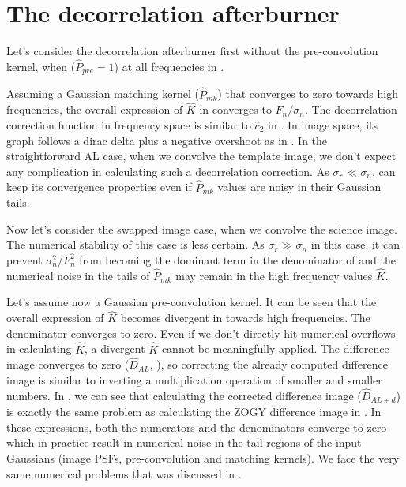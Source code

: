 \section{The decorrelation afterburner\label{sec:decorrab}}
Let's consider the decorrelation afterburner first without the
pre-convolution kernel, when (\(\hat{P}_{pre}=1\)) at all frequencies
in .
%
\par Assuming a Gaussian matching kernel (\(\hat{P}_{mk}\)) that
converges to zero towards high frequencies, the overall expression of
\(\hat{K}\) in  converges to \(F_{n}/\sigma_n\). The
decorrelation correction function in frequency space is similar to
\(\hat{c}_2\) in . In image space, its
graph follows a dirac delta plus a negative overshoot as in
. In the straightforward AL case, when
we convolve the template image, we don't expect any complication in
calculating such a decorrelation correction. As \(\sigma_r \ll
\sigma_n\),  can keep its convergence properties even if
\(\hat{P}_{mk}\) values are noisy in their Gaussian tails.
%
\par Now let's consider the swapped image case, when we convolve the
science image.  The numerical stability of this case is less
certain. As \(\sigma_r \gg \sigma_n\) in this case, it can prevent
\(\sigma_{n}^2/F_n^2\) from becoming the dominant term in the
denominator of  and the numerical noise in the tails of
\(\hat{P}_{mk}\) may remain in the high frequency values \(\hat{K}\).
%
\par Let's assume now a Gaussian pre-convolution kernel. It can be
seen that the overall expression of \(\hat{K}\) becomes divergent in
 towards high frequencies. The denominator converges to
zero. Even if we don't directly hit numerical overflows in calculating
\(\hat{K}\), a divergent \(\hat{K}\) cannot be meaningfully
applied. The difference image converges to zero (\(\hat{D}_{AL}\),
), so correcting the already computed difference image is
similar to inverting a multiplication operation of smaller and smaller
numbers. In , we can see that calculating the
corrected difference image (\(\hat{D}_{AL+d}\)) is exactly the same
problem as calculating the ZOGY difference image in . In
these expressions, both the numerators and the denominators converge to
zero which in practice result in numerical noise in the tail regions
of the input Gaussians (image PSFs, pre-convolution and matching
kernels). We face the very same numerical problems that was discussed
in .
% 
